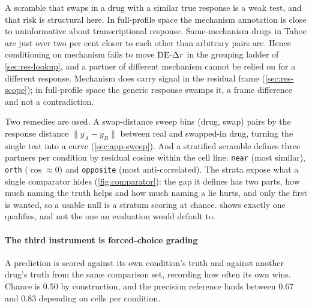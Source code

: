 A scramble that swaps in a drug with a similar true response is a weak test, and
that risk is structural here. In full-profile space the mechanism annotation is
close to uninformative about transcriptional response. Same-mechanism drugs in
Tahoe are just over two per cent closer to each other than arbitrary pairs
are.
Hence conditioning on mechanism fails to move $\textrm{DE-}\Delta r$ in the grouping ladder of
\cref{sec:res-lookup}, and a partner of different mechanism cannot be relied on
for a different response. Mechanism does carry signal in the residual frame
(\cref{sec:res-scope}); in full-profile space the generic response swamps it, a
frame difference and not a contradiction.

Two remedies are used. A swap-distance sweep bins (drug, swap) pairs by the
response distance $\lVert y_A - y_B \rVert$ between real and swapped-in drug,
turning the single test into a curve (\cref{sec:app-sweep}). And a stratified
scramble defines three partners per condition by residual cosine within the cell
line: \texttt{near} (most similar), \texttt{orth} ($\cos\approx0$) and
\texttt{opposite} (most anti-correlated). The strata expose what a single
comparator hides (\cref{fig:comparator}): the gap it defines has two parts, how
much naming the truth helps and how much naming a lie hurts, and only the first
is wanted, so a usable null is a stratum scoring at chance.
 shows exactly one qualifies, and not the one an
evaluation would default to.

\paragraph{The third instrument is forced-choice grading} A prediction is scored
against its own condition's truth and against another drug's truth from the same
comparison set, recording how often its own wins. Chance is $0.50$ by
construction, and the precision reference lands between $0.67$ and $0.83$
depending on cells per condition.


